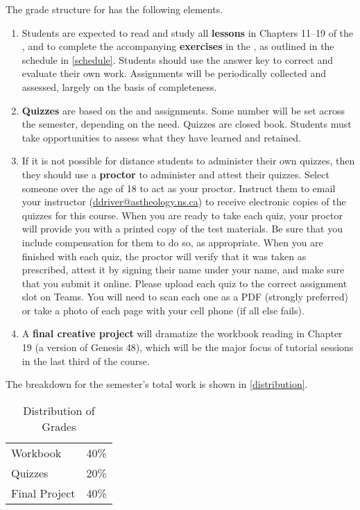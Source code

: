 \documentclass[titlepage]{article}
\begin{document}
The grade structure for \ccode has the following elements.

\begin{enumerate}
 \item
    Students are expected to read and study all \textbf{lessons} in
    Chapters 11–19 of the \cite{lbh}, and to complete the accompanying
    \textbf{exercises} in the \cite{work}, as outlined in the schedule
    in \autoref{schedule}. Students should use the answer key to correct
    and evaluate their own work. Assignments will be periodically
    collected and assessed, largely on the basis of completeness.
 \item
    \textbf{Quizzes} are based on the \cite{lbh} and \cite{work}
    assignments. Some number will be set across the semester, depending
    on the need. Quizzes are closed book. Students must take
    opportunities to assess what they have learned and retained.
 \item
    If it is not possible for distance students to administer their own
    quizzes, then they should use a \textbf{proctor} to administer and
    attest their quizzes. Select someone over the age of 18 to act as
    your proctor. Instruct them to email your instructor
    (\href{mailto:ddriver@astheology.ns.ca}{ddriver@astheology.ns.ca})
    to receive electronic copies of the quizzes for this course. When
    you are ready to take each quiz, your proctor will provide you with
    a printed copy of the test materials. Be sure that you include
    compensation for them to do so, as appropriate. When you are
    finished with each quiz, the proctor will verify that it was taken
    as prescribed, attest it by signing their name under your name, and
    make sure that you submit it online. Please upload each quiz to the
    correct assignment slot on Teams. You will need to scan each one as
    a PDF (strongly preferred) or take a photo of each page with your
    cell phone (if all else fails).
 \item
    A \textbf{final creative project} will dramatize the workbook
    reading in Chapter 19 (a version of Genesis 48), which will be the
    major focus of tutorial sessions in the last third of the course.
\end{enumerate}

The breakdown for the semester's total work is shown in
\autoref{distribution}.

\begin{table}[htbp]
  \centering
  {\lining
  \begin{tabular}{lr}
    \toprule
    Workbook      & 40\% \\
    Quizzes       & 20\% \\
    Final Project & 40\% \\
    \bottomrule
  \end{tabular}}
  \caption{Distribution of Grades}
  \label{distribution}
\end{table}
\end{document}

